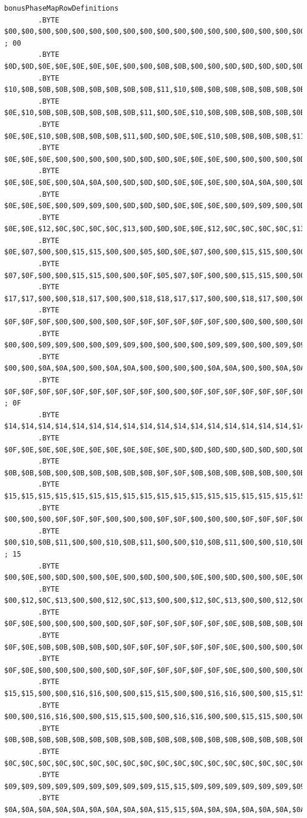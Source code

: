 \begin{lstlisting}[basicstyle=\tiny]
bonusPhaseMapRowDefinitions   
        .BYTE $00,$00,$00,$00,$00,$00,$00,$00,$00,$00,$00,$00,$00,$00,$00,$00,$00,$00,$00,$00 ; 00
        .BYTE $0D,$0D,$0E,$0E,$0E,$0E,$0E,$00,$00,$0B,$0B,$00,$00,$0D,$0D,$0D,$0D,$0D,$0E,$0E 
        .BYTE $10,$0B,$0B,$0B,$0B,$0B,$0B,$0B,$0B,$11,$10,$0B,$0B,$0B,$0B,$0B,$0B,$0B,$0B,$11
        .BYTE $0E,$10,$0B,$0B,$0B,$0B,$0B,$0B,$11,$0D,$0E,$10,$0B,$0B,$0B,$0B,$0B,$0B,$11,$0D
        .BYTE $0E,$0E,$10,$0B,$0B,$0B,$0B,$11,$0D,$0D,$0E,$0E,$10,$0B,$0B,$0B,$0B,$11,$0D,$0D
        .BYTE $0E,$0E,$0E,$00,$00,$00,$00,$0D,$0D,$0D,$0E,$0E,$0E,$00,$00,$00,$00,$0D,$0D,$0D
        .BYTE $0E,$0E,$0E,$00,$0A,$0A,$00,$0D,$0D,$0D,$0E,$0E,$0E,$00,$0A,$0A,$00,$0D,$0D,$0D
        .BYTE $0E,$0E,$0E,$00,$09,$09,$00,$0D,$0D,$0D,$0E,$0E,$0E,$00,$09,$09,$00,$0D,$0D,$0D
        .BYTE $0E,$0E,$12,$0C,$0C,$0C,$0C,$13,$0D,$0D,$0E,$0E,$12,$0C,$0C,$0C,$0C,$13,$0D,$0D
        .BYTE $0E,$07,$00,$00,$15,$15,$00,$00,$05,$0D,$0E,$07,$00,$00,$15,$15,$00,$00,$05,$0D
        .BYTE $07,$0F,$00,$00,$15,$15,$00,$00,$0F,$05,$07,$0F,$00,$00,$15,$15,$00,$00,$0F,$05
        .BYTE $17,$17,$00,$00,$18,$17,$00,$00,$18,$18,$17,$17,$00,$00,$18,$17,$00,$00,$18,$18
        .BYTE $0F,$0F,$0F,$00,$00,$00,$00,$0F,$0F,$0F,$0F,$0F,$0F,$00,$00,$00,$00,$0F,$0F,$0F
        .BYTE $00,$00,$09,$09,$00,$00,$09,$09,$00,$00,$00,$00,$09,$09,$00,$00,$09,$09,$00,$00
        .BYTE $00,$00,$0A,$0A,$00,$00,$0A,$0A,$00,$00,$00,$00,$0A,$0A,$00,$00,$0A,$0A,$00,$00
        .BYTE $0F,$0F,$0F,$0F,$0F,$0F,$0F,$0F,$0F,$00,$00,$0F,$0F,$0F,$0F,$0F,$0F,$0F,$0F,$0F ; 0F
        .BYTE $14,$14,$14,$14,$14,$14,$14,$14,$14,$14,$14,$14,$14,$14,$14,$14,$14,$14,$14,$14
        .BYTE $0F,$0E,$0E,$0E,$0E,$0E,$0E,$0E,$0E,$0E,$0D,$0D,$0D,$0D,$0D,$0D,$0D,$0D,$0D,$0F
        .BYTE $0B,$0B,$0B,$00,$0B,$0B,$0B,$0B,$0B,$0F,$0F,$0B,$0B,$0B,$0B,$0B,$00,$0B,$0B,$0B
        .BYTE $15,$15,$15,$15,$15,$15,$15,$15,$15,$15,$15,$15,$15,$15,$15,$15,$15,$15,$15,$15
        .BYTE $00,$00,$00,$0F,$0F,$0F,$00,$00,$00,$0F,$0F,$00,$00,$00,$0F,$0F,$0F,$00,$00,$00
        .BYTE $00,$10,$0B,$11,$00,$00,$10,$0B,$11,$00,$00,$10,$0B,$11,$00,$00,$10,$0B,$11,$00 ; 15 
        .BYTE $00,$0E,$00,$0D,$00,$00,$0E,$00,$0D,$00,$00,$0E,$00,$0D,$00,$00,$0E,$00,$0D,$00
        .BYTE $00,$12,$0C,$13,$00,$00,$12,$0C,$13,$00,$00,$12,$0C,$13,$00,$00,$12,$0C,$13,$00
        .BYTE $0F,$0E,$00,$00,$00,$00,$0D,$0F,$0F,$0F,$0F,$0F,$0F,$0E,$0B,$0B,$0B,$0B,$0D,$0F
        .BYTE $0F,$0E,$0B,$0B,$0B,$0B,$0D,$0F,$0F,$0F,$0F,$0F,$0F,$0E,$00,$00,$00,$00,$0D,$0F
        .BYTE $0F,$0E,$00,$00,$00,$00,$0D,$0F,$0F,$0F,$0F,$0F,$0F,$0E,$00,$00,$00,$00,$0D,$0F
        .BYTE $15,$15,$00,$00,$16,$16,$00,$00,$15,$15,$00,$00,$16,$16,$00,$00,$15,$15,$00,$00
        .BYTE $00,$00,$16,$16,$00,$00,$15,$15,$00,$00,$16,$16,$00,$00,$15,$15,$00,$00,$16,$16
        .BYTE $0B,$0B,$0B,$0B,$0B,$0B,$0B,$0B,$0B,$0B,$0B,$0B,$0B,$0B,$0B,$0B,$0B,$0B,$0B,$0B
        .BYTE $0C,$0C,$0C,$0C,$0C,$0C,$0C,$0C,$0C,$0C,$0C,$0C,$0C,$0C,$0C,$0C,$0C,$0C,$0C,$0C
        .BYTE $09,$09,$09,$09,$09,$09,$09,$09,$09,$15,$15,$09,$09,$09,$09,$09,$09,$09,$09,$09
        .BYTE $0A,$0A,$0A,$0A,$0A,$0A,$0A,$0A,$0A,$15,$15,$0A,$0A,$0A,$0A,$0A,$0A,$0A,$0A,$0A
\end{lstlisting}

